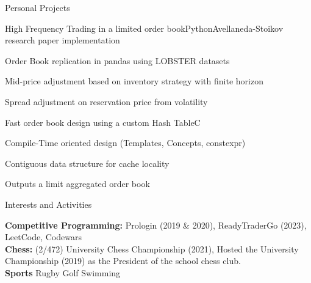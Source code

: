 \documentclass[
	a4paper, %
	10pt, %
]{resume} %
\def\CC{{C\nolinebreak[4]\hspace{-.05em}\raisebox{.4ex}{\tiny\bf ++}}}
\begin{document}
\begin{rSection}{Personal Projects}

	\begin{rSubsection}{High Frequency Trading in a limited order book}{Python}{Avellaneda-Stoikov research paper implementation}{}
		\item Order Book replication in pandas using LOBSTER datasets
		\item Mid-price adjustment based on inventory strategy with finite horizon
		\item Spread adjustment on reservation price from volatility
	\end{rSubsection}

	\begin{rSubsection}{Fast order book design using a custom Hash Table}{\CC}{}{}
		\item Compile-Time oriented design (Templates, Concepts, constexpr)
		\item Contiguous data structure for cache locality
		\item Outputs a limit aggregated order book
	\end{rSubsection}

\end{rSection}

\begin{rSection}{Interests and Activities}

	\textbf{Competitive Programming:} Prologin (2019 \& 2020), ReadyTraderGo (2023), LeetCode, Codewars \\
	\textbf{Chess:} (2/472) University Chess Championship (2021), Hosted the University Championship (2019) as the President of the school chess club.\\
	\textbf{Sports} Rugby  Golf  Swimming

\end{rSection}
\end{document}

